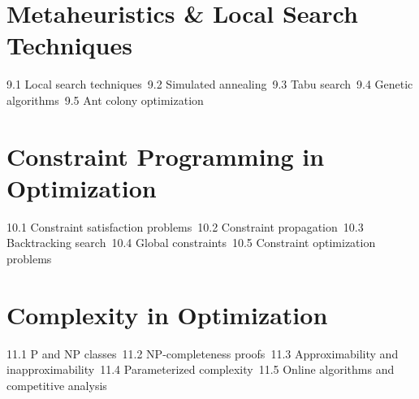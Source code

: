 \section{Metaheuristics \& Local Search Techniques}
9.1 Local search techniques\
9.2 Simulated annealing\
9.3 Tabu search\
9.4 Genetic algorithms\
9.5 Ant colony optimization\
\section{Constraint Programming in Optimization}
10.1 Constraint satisfaction problems\
10.2 Constraint propagation\
10.3 Backtracking search\
10.4 Global constraints\
10.5 Constraint optimization problems\
\section{Complexity in Optimization}
11.1 P and NP classes\
11.2 NP-completeness proofs\
11.3 Approximability and inapproximability\
11.4 Parameterized complexity\
11.5 Online algorithms and competitive analysis\
